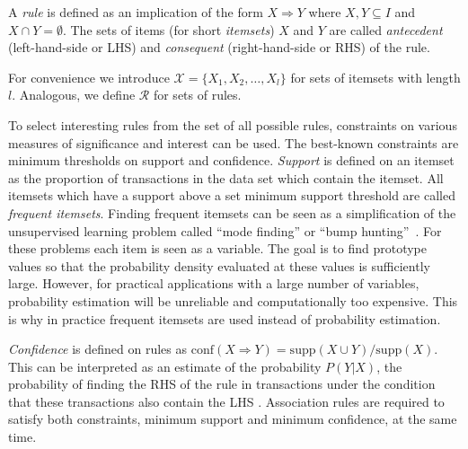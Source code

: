 \documentclass[10pt,a4paper]{article}
\newcommand{\set}[1]{\mathcal{#1}}
\begin{document}
A \emph{rule} is defined as an implication of the form $X \Rightarrow Y$
where $X, Y \subseteq I$ and $X \cap Y = \emptyset$.  The sets of items
(for short \emph{itemsets}) $X$ and $Y$ are called \emph{antecedent}
(left-hand-side or LHS) and \emph{consequent} (right-hand-side or RHS)
of the rule.

For convenience we introduce 
$\set{X} = \{X_1, X_2, \ldots, X_l\}$
for sets of itemsets with length $l$.
Analogous, we define $\set{R}$ for sets of rules.

To select interesting rules from the set of all possible rules,
constraints on various measures of significance and interest can be
used.  The best-known constraints are minimum thresholds on support and
confidence.  \emph{Support} is defined on an itemset as the proportion
of transactions in the data set which contain the itemset.  All itemsets
which have a support above a set minimum support threshold are called
\emph{frequent itemsets}.  
Finding frequent itemsets can be seen as a simplification of
the unsupervised learning problem called
``mode finding'' or 
``bump hunting''~\citep{arules:Hastie+Tibshirani+Friedman:2001}.
For these problems each item is seen as a variable.
The goal is to find
prototype values so that the probability density
evaluated at these values is sufficiently large.
However, for practical applications with a large number of variables, 
probability estimation will be unreliable and computationally too expensive.
This is why in practice frequent itemsets are used instead of 
probability estimation.

\emph{Confidence} is defined on rules as $\mathrm{conf}(X\Rightarrow Y)
= \mathrm{supp}(X \cup Y) / \mathrm{supp}(X)$.  This can be interpreted
as an estimate of the probability $P(Y|X)$, the probability of finding
the RHS of the rule in transactions under the condition that these
transactions also contain the LHS 
\citep[see e.g.,][]{arules:Hipp+Guentzer+Nakhaeizadeh:2000}.  
Association rules are
required to satisfy both constraints, minimum support and
minimum confidence, at the same time.
\end{document}
